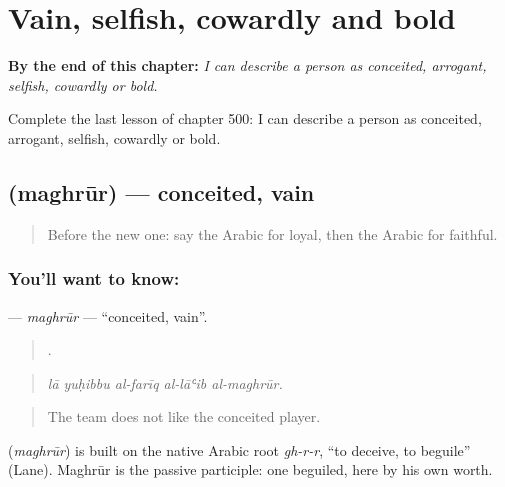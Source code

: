 
\chapter{Vain, selfish, cowardly and bold}
\label{ch:ar-vain-selfish-cowardly-and-bold}

\begin{chapteropening}
\textbf{By the end of this chapter:} \emph{I can describe a person as conceited, arrogant, selfish, cowardly or bold.}

Complete the last lesson of chapter 500: I can describe a person as conceited, arrogant, selfish, cowardly or bold.
\end{chapteropening}

\section[\texorpdfstring{\ar{مغرور} (maghrūr)}{مغرور (maghrūr)}]{ (maghrūr) — conceited, vain}

\label{lesson:AR-C500-maghrur}



\begin{quote}
Before the new one: say the Arabic for loyal, then the Arabic for faithful.
\end{quote}

\subsection*{You'll want to know: }
\textbf{} — \emph{maghrūr} — \textquotedblleft{}conceited, vain\textquotedblright{}.

\begin{quote}
    .
\end{quote}

\begin{quote}
\emph{lā yuḥibbu al-farīq al-lāʿib al-maghrūr.}
\end{quote}

\begin{quote}
The team does not like the conceited player.
\end{quote}

\begin{cousinweb}
\textbf{} (\emph{maghrūr}) is built on the native Arabic root \emph{gh-r-r}, \textquotedblleft{}to deceive, to beguile\textquotedblright{} (Lane). Maghrūr is the passive participle: one beguiled, here by his own worth.
\end{cousinweb}

